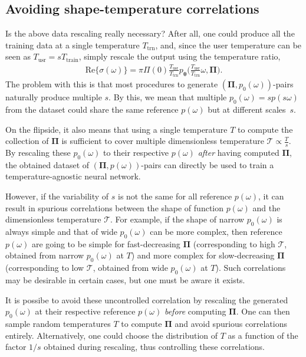 \documentclass[notitlepage,11pt,nofootinbib]{revtex4-1}
\renewcommand{\vec}[1]{\bm{#1}}
\begin{document}
\subsection{Avoiding shape-temperature correlations}
Is the above data rescaling really necessary? After all, one could produce all the training data at a single temperature $T_{\text{trn}}$, and, since the user temperature can be seen as $T_{\text{usr}} = sT_{\text{train}}$, simply rescale the output using the temperature ratio, 
\begin{align}
\text{Re}\{ \sigma(\omega) \} = \pi\Pi(0) 
\frac{T_{\text{usr}}}{T_{\text{trn}}} p_{\vec \theta}\Big( \frac{T_{\text{usr}}}{T_{\text{trn}}}\omega, \vec \Pi\Big).
\end{align}
The problem with this is that most procedures to generate $(\vec\Pi,p_0(\omega))$-pairs naturally produce multiple $s$. By this, we mean that multiple $p_0(\omega)=sp(s\omega)$ from the dataset could share the same reference $p(\omega)$ but at different scales~$s$.

On the flipside, it also means that using a single temperature $T$ to compute the collection of $\vec \Pi$ is sufficient to cover multiple dimensionless temperature $\mathcal T\propto\frac{T}{s}$. By rescaling these $p_0(\omega)$ to their respective $p(\omega)$ \emph{after} having computed $\vec \Pi$, the obtained dataset of $(\vec \Pi, p(\omega))$-pairs can directly be used to train a temperature-agnostic neural network.

However, if the variability of $s$ is not the same for all reference $p(\omega)$, it can result in spurious correlations between the shape of function $p(\omega)$ and the dimensionless temperature $\mathcal T$. For example, if the shape of narrow $p_0(\omega)$ is always simple and that of wide $p_0(\omega)$ can be more complex, then reference $p(\omega)$ are going to be simple for fast-decreasing $\vec \Pi$ (corresponding to high $\mathcal T$, obtained from narrow $p_0(\omega)$ at $T$) and more complex for slow-decreasing $\vec \Pi$ (corresponding to low $\mathcal T$, obtained from wide $p_0(\omega)$ at $T$). Such correlations may be desirable in certain cases, but one must be aware it exists.

It is possibe to avoid these uncontrolled correlation by rescaling the generated $p_0(\omega)$ at their respective reference $p(\omega)$ \emph{before} computing $\vec \Pi$. One can then sample random temperatures $T$ to compute $\vec \Pi$ and avoid spurious correlations entirely. Alternatively, one could choose the distribution of $T$ as a function of the factor $1/s$ obtained during rescaling, thus controlling these correlations.
\end{document}
